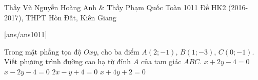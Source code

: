 \begin{name}
{Thầy Vũ Nguyễn Hoàng Anh \& Thầy Phạm Quốc Toàn}
{1011 Đề HK2 (2016-2017), THPT Hòn Đất, Kiên Giang}
\end{name}
\setcounter{ex}{0}\setcounter{bt}{0}
[ans/ans1011]
\begin{ex}%
Trong mặt phẳng tọa độ $O x y$, cho ba điểm $A (2; -1)$, $B (1; -3)$, $C (0; -1)$. Viết phương trình đường cao hạ từ đỉnh $A$ của tam giác $ABC$. 
	\choice
	{$x+2y-4=0$}
	{\True $x-2y-4=0$}
	{$2x-y+4=0$}
	{$x+4y+2=0$}
\end{ex}

